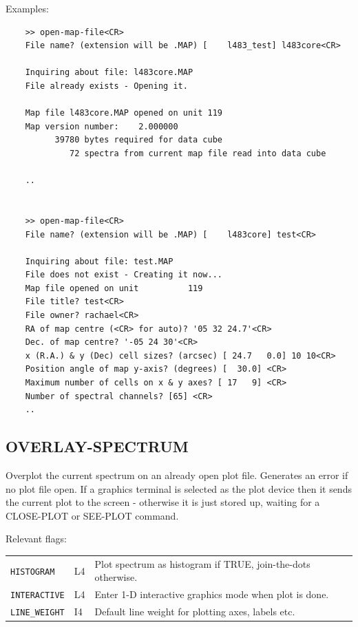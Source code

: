 \documentclass[11pt,twoside]{report}
\begin{document}
Examples:
\begin{verbatim}
    >> open-map-file<CR>
    File name? (extension will be .MAP) [    l483_test] l483core<CR>

    Inquiring about file: l483core.MAP
    File already exists - Opening it.

    Map file l483core.MAP opened on unit 119
    Map version number:    2.000000
          39780 bytes required for data cube
             72 spectra from current map file read into data cube

    ..


    >> open-map-file<CR>
    File name? (extension will be .MAP) [    l483core] test<CR>

    Inquiring about file: test.MAP
    File does not exist - Creating it now...
    Map file opened on unit          119
    File title? test<CR>
    File owner? rachael<CR>
    RA of map centre (<CR> for auto)? '05 32 24.7'<CR>
    Dec. of map centre? '-05 24 30'<CR>
    x (R.A.) & y (Dec) cell sizes? (arcsec) [ 24.7   0.0] 10 10<CR>
    Position angle of map y-axis? (degrees) [  30.0] <CR>
    Maximum number of cells on x & y axes? [ 17   9] <CR>
    Number of spectral channels? [65] <CR>
    ..
\end{verbatim}

\subsection{OVERLAY-SPECTRUM} 

Overplot the current spectrum on an already open plot file. Generates an
error if no plot file open. If a graphics terminal is selected as the
plot device then it sends the current plot to the screen - otherwise it
is just stored up, waiting for a CLOSE-PLOT or SEE-PLOT command.

Relevant flags:\\
\begin{tabular}{lll}
  \verb+HISTOGRAM+   & L4 & Plot spectrum as histogram if TRUE,
                            join-the-dots otherwise.\\
  \verb+INTERACTIVE+ & L4 & Enter 1-D interactive graphics mode when
                            plot is done.\\
  \verb+LINE_WEIGHT+ & I4 & Default line weight for plotting axes,
                            labels etc.
\end{tabular}
\end{document}
